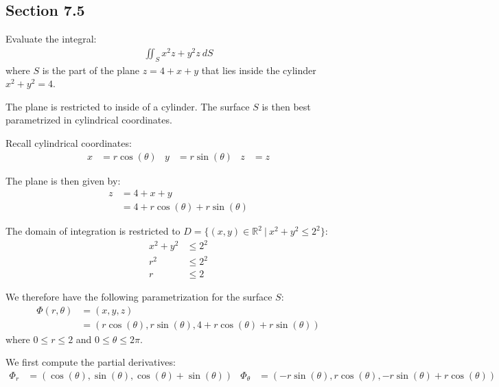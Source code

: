 \subsection{Section 7.5}

\begin{tcolorbox}[
        title={Problem 6},
        valign=center,
        nobeforeafter,
        colframe=gray!95!black
    ]
    Evaluate the integral:
    \begin{align}
        \iint_S x^2z + y^2z \ dS
    \end{align}
    where \(S\) is the part of the plane \(z = 4 + x + y\) that lies inside the cylinder \(x^2 + y^2 = 4\).
\end{tcolorbox}

\begin{solution}
    The plane is restricted to inside of a cylinder. The surface \(S\) is then best parametrized in cylindrical coordinates. 
    
    Recall cylindrical coordinates:
    \begin{align}
        x &= r\cos(\theta) & y &= r\sin(\theta) & z &= z
    \end{align}
    
    The plane is then given by:
    \begin{align*}
        z &= 4 + x + y \\
        &= 4 + r \cos(\theta) + r \sin(\theta)
    \end{align*}
    
    The domain of integration is restricted to \(D = \{(x, y) \in \mathbb{R}^2 \ | \ x^2 + y^2 \leq 2^2\}\):
    \begin{align*}
        x^2 + y^2 &\leq 2^2 \\
        r^2 &\leq 2^2 \\
        r &\leq 2
    \end{align*}
    
    We therefore have the following parametrization for the surface \(S\):
    \begin{align}
        \Phi(r, \theta) &= \left(x, y, z\right) \\
        &= \left(r\cos(\theta), r\sin(\theta), 4 + r\cos(\theta) + r\sin(\theta)\right)
    \end{align}
    where \(0 \leq r \leq 2\) and \(0 \leq \theta \leq 2\pi\).
    
    We first compute the partial derivatives:
    \begin{align*}
        \Phi_r &= \left(\cos(\theta), \sin(\theta), \cos(\theta) + \sin(\theta)\right) & \Phi_\theta &= \left(-r\sin(\theta), r\cos(\theta), -r\sin(\theta) + r\cos(\theta)\right)
    \end{align*}
    

\end{solution}
